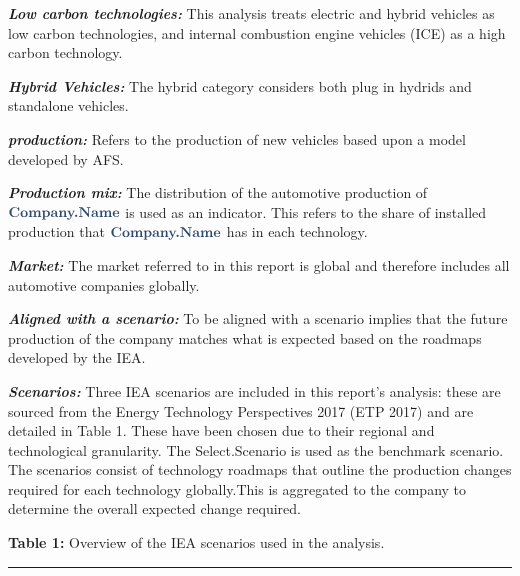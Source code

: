 \documentclass[10pt,table,a4]{article}\usepackage[]{graphicx}\usepackage[]{color}
\newcommand{\Companyname}{\textbf{\textcolor{Blue1}{Company.Name}}}
\newcommand{\Tab}[1]{\textbf{\textcolor{Blue1}{Table #1}}}
\newcommand{\TabCap}[1]{{\textcolor{Blue1}{#1}}}
\begin{document}
	\textbf{\emph{Low carbon technologies:}} This analysis treats electric and hybrid vehicles as low carbon technologies, and internal combustion engine vehicles (ICE) as a high carbon technology. 
	
	\textbf{\emph{Hybrid Vehicles:}} The hybrid category considers both plug in hydrids and standalone vehicles.  
	
	\textbf{\emph{production:}} Refers to the production of new vehicles based upon a model developed by AFS. 
	
	\textbf{\emph{Production mix:}} The distribution of the automotive production of \(\Companyname\) is used as an indicator. This refers to the share of installed production that \(\Companyname\) has in each technology.\par
	
	\textbf{\emph{Market:}} The market referred to in this report is global and therefore includes all automotive companies globally.
	
	\textbf{\emph{Aligned with a scenario:}} To be aligned with a scenario implies that the future production of the company matches what is expected based on the roadmaps developed by the IEA.\par
	
	\textbf{\emph{Scenarios:}} Three IEA scenarios are included in this report's analysis: these are sourced from the Energy Technology Perspectives 2017 (ETP 2017) and are detailed in Table 1. These have been chosen due to their regional and technological gra\-nu\-la\-ri\-ty. The Select.Scenario is used as the benchmark scenario. The scenarios consist of technology roadmaps that outline the production changes required for each technology globally.This is aggregated to the company to determine the overall expected change required.\par
	
	
	\vspace{0.3cm}
	\Tab{1:} \TabCap{Overview of the IEA scenarios used in the analysis.}
	
	\begin{center} %
	\end{center}
	\vspace{0.1cm}
	\noindent\rule{8cm}{0.2pt}\\
	
\end{document}
